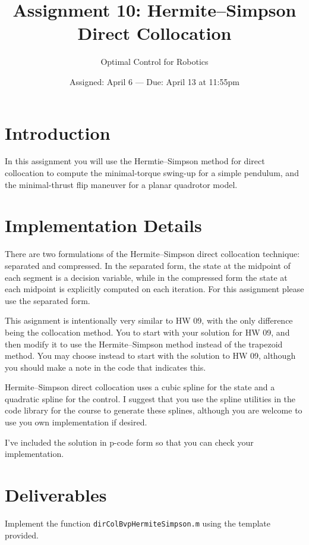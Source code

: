 

\title{Assignment 10:  Hermite--Simpson Direct Collocation}
\date{Assigned:  April 6  ---  Due:  April 13 at 11:55pm}
\author{Optimal Control for Robotics}

\maketitle

\section*{Introduction}

In this assignment you will use the Hermtie--Simpson method for direct collocation
to compute the minimal-torque swing-up for a simple pendulum,
and the minimal-thrust flip maneuver for a planar quadrotor model.

\section*{Implementation Details}

\par There are two formulations of the Hermite--Simpson direct collocation
technique: separated and compressed. In the separated form, the state at the
midpoint of each segment is a decision variable, while in the compressed form
the state at each midpoint is explicitly computed on each iteration.
For this assignment please use the separated form.

\par This asignment is intentionally very similar to HW 09, with the
only difference being the collocation method.
You to start with your solution for HW 09, and then modify it to use the
Hermite--Simpson method instead of the trapezoid method.
You may choose instead to start with the solution to HW 09,
although you should make a note in the code that indicates this.

\par Hermite--Simpson direct collocation uses a cubic spline for the state and
a quadratic spline for the control. I suggest that you use the spline utilities
in the code library for the course to generate these splines, although you are
welcome to use you own implementation if desired.

\par I've included the solution in p-code form so that you can check your
implementation.

\section*{Deliverables}

Implement the function \texttt{dirColBvpHermiteSimpson.m} using the template provided.


